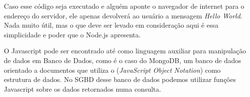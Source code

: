 Caso esse código seja executado e alguém aponte o navegador de internet para o endereço do servidor, ele apenas devolverá ao usuário a mensagem \textit{Hello World}. Nada muito útil, mas o que deve ser levado em consideração aqui é essa simplicidade e poder que o Node.js apresenta.

O Javascript pode ser encontrado até como linguagem auxiliar para manipulação de dados em Banco de Dados, como é o caso do MongoDB, um banco de dados orientado a documentos que utiliza o  (\textit{JavaScript Object Notation}) como estrutura de dados.
No SGBD desse banco de dados podemos utilizar funções Javascript sobre os dados retornados numa consulta.